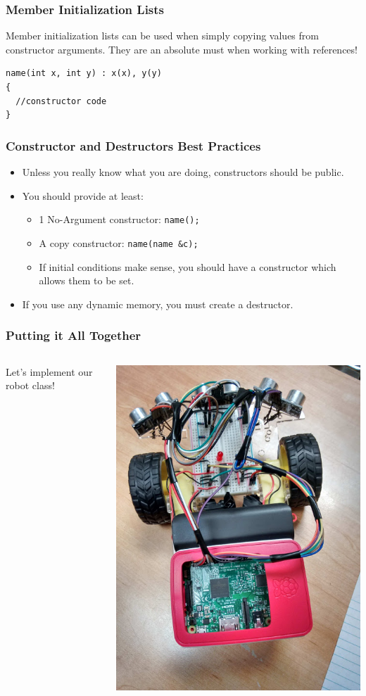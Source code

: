 \documentclass[handout]{beamer}
\begin{document}
\begin{frame}[fragile]
   \frametitle{Member Initialization Lists}
   Member initialization lists can be used when simply copying values
   from constructor arguments.  They are an absolute must when working
   with references!
   \begin{verbatim}
name(int x, int y) : x(x), y(y)
{
  //constructor code
}
   \end{verbatim}
\end{frame}

\begin{frame}
   \frametitle{Constructor and Destructors Best Practices}
   \begin{itemize}
   \item Unless you really know what you are doing, constructors 
     should be public.
   \item You should provide at least:
   \begin{itemize}
     \item 1 No-Argument constructor: {\tt name(); }
     \item A copy constructor: {\tt name(name \&c); }
     \item If initial conditions make sense, you should have a constructor
       which allows them to be set.
   \end{itemize}
   \item If you use any dynamic memory, you must create a destructor.
   \end{itemize}
\end{frame}

\begin{frame}
   \frametitle{Putting it All Together}
   \begin{columns}
   Let's implement our robot class!
   
   \includegraphics[width=\textwidth]{images/robot-top}
   \end{columns}
\end{frame}
\end{document}
